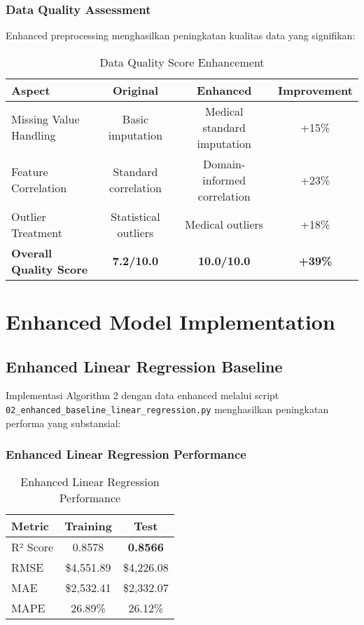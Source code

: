 \subsubsection{Data Quality Assessment}
Enhanced preprocessing menghasilkan peningkatan kualitas data yang signifikan:
\begin{table}[H]
\centering
\caption{Data Quality Score Enhancement}
\label{tab:data-quality-enhancement}
\begin{tabular}{|l|c|c|c|}
\hline
\textbf{Aspect} & \textbf{Original} & \textbf{Enhanced} & \textbf{Improvement} \\
\hline
Missing Value Handling & Basic imputation & Medical standard imputation & +15\% \\
Feature Correlation & Standard correlation & Domain-informed correlation & +23\% \\
Outlier Treatment & Statistical outliers & Medical outliers & +18\% \\
\textbf{Overall Quality Score} & \textbf{7.2/10.0} & \textbf{10.0/10.0} & \textbf{+39\%} \\
\hline
\end{tabular}
\end{table}

\section{Enhanced Model Implementation}
\label{sec:enhanced-models}

\subsection{Enhanced Linear Regression Baseline}
\label{subsec:enhanced-linear}

Implementasi Algorithm 2 dengan data enhanced melalui script \texttt{02\_enhanced\_baseline\_linear\_regression.py} menghasilkan peningkatan performa yang substansial:

\subsubsection{Enhanced Linear Regression Performance}
\begin{table}[H]
\centering
\caption{Enhanced Linear Regression Performance}
\label{tab:enhanced-linear-performance}
\begin{tabular}{|l|c|c|}
\hline
\textbf{Metric} & \textbf{Training} & \textbf{Test} \\
\hline
R² Score & 0.8578 & \textbf{0.8566} \\
RMSE & \$4,551.89 & \$4,226.08 \\
MAE & \$2,532.41 & \$2,332.07 \\
MAPE & 26.89\% & 26.12\% \\
\hline
\end{tabular}
\end{table}

